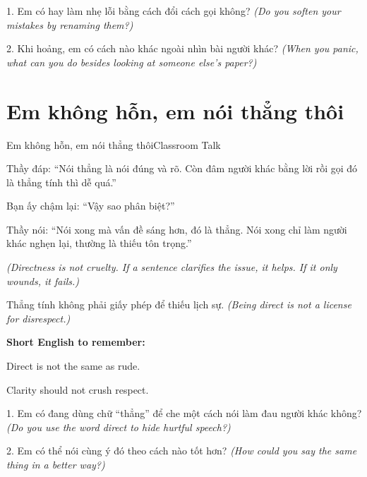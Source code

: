 \begin{tuhocnhanh}
1. Em có hay làm nhẹ lỗi bằng cách đổi cách gọi không? \textit{(Do you soften your mistakes by renaming them?)}

2. Khi hoảng, em có cách nào khác ngoài nhìn bài người khác? \textit{(When you panic, what can you do besides looking at someone else’s paper?)}
\end{tuhocnhanh}
\ngancach

\section{Em không hỗn, em nói thẳng thôi}
\begin{truyen}{Em không hỗn, em nói thẳng thôi}{Classroom Talk}

Thầy đáp: ``Nói thẳng là nói đúng và rõ. Còn đâm người khác bằng lời rồi gọi đó là thẳng tính thì dễ quá.''

Bạn ấy chậm lại: ``Vậy sao phân biệt?''

Thầy nói: ``Nói xong mà vấn đề sáng hơn, đó là thẳng. Nói xong chỉ làm người khác nghẹn lại, thường là thiếu tôn trọng.''

\textit{(Directness is not cruelty. If a sentence clarifies the issue, it helps. If it only wounds, it fails.)}
\end{truyen}

\begin{baihoc}
Thẳng tính không phải giấy phép để thiếu lịch sự.
\textit{(Being direct is not a license for disrespect.)}
\end{baihoc}

\begin{ghinhoanh}
\textbf{Short English to remember:}

Direct is not the same as rude.

Clarity should not crush respect.
\end{ghinhoanh}

\begin{tuhocnhanh}
1. Em có đang dùng chữ ``thẳng'' để che một cách nói làm đau người khác không? \textit{(Do you use the word direct to hide hurtful speech?)}

2. Em có thể nói cùng ý đó theo cách nào tốt hơn? \textit{(How could you say the same thing in a better way?)}
\end{tuhocnhanh}
\ngancach